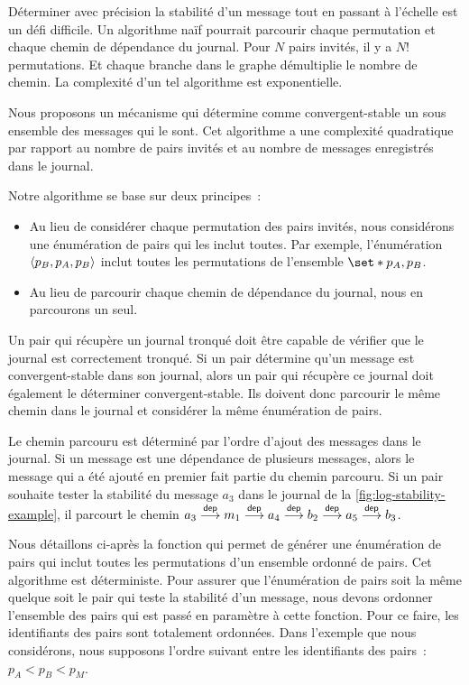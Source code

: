 Déterminer avec précision la stabilité d'un message tout en passant à l'échelle est un défi difficile.
Un algorithme naïf pourrait parcourir chaque permutation et chaque chemin de dépendance du journal.
Pour $N$ pairs invités, il y a $N!$ permutations.
Et chaque branche dans le graphe démultiplie le nombre de chemin.
La complexité d'un tel algorithme est exponentielle.

Nous proposons un mécanisme qui détermine comme convergent-stable un sous ensemble des messages qui le sont.
Cet algorithme a une complexité quadratique par rapport au nombre de pairs invités et au nombre de messages enregistrés dans le journal.

Notre algorithme se base sur deux principes~:
\begin{itemize}
    \item Au lieu de considérer chaque permutation des pairs invités, nous considérons une énumération de pairs qui les inclut toutes.
    Par exemple, l'énumération $\tuple*{p_B, p_A, p_B}$ inclut toutes les permutations de l'ensemble $\set*{p_A, p_B}$.
    \item Au lieu de parcourir chaque chemin de dépendance du journal, nous en parcourons un seul.
\end{itemize}

Un pair qui récupère un journal tronqué doit être capable de vérifier que le journal est correctement 
tronqué.
Si un pair détermine qu'un message est convergent-stable dans son journal, alors un pair qui récupère ce journal doit également le déterminer convergent-stable.
Ils doivent donc parcourir le même chemin dans le journal et considérer la même énumération de pairs.

Le chemin parcouru est déterminé par l'ordre d'ajout des messages dans le journal.
Si un message est une dépendance de plusieurs messages, alors le message qui a été ajouté en premier fait partie du chemin parcouru.
Si un pair souhaite tester la stabilité du message $a_3$ dans le journal de la \autoref{fig:log-stability-example}, il parcourt le chemin $a_3 \dep m_1 \dep a_4 \dep b_2 \dep a_5 \dep b_3$.

Nous détaillons ci-après la fonction qui permet de générer une énumération de pairs qui inclut toutes les permutations d'un ensemble ordonné de pairs.
Cet algorithme est déterministe.
Pour assurer que l'énumération de pairs soit la même quelque soit le pair qui teste la stabilité d'un message, nous devons ordonner l'ensemble des pairs qui est passé en paramètre à cette fonction.
Pour ce faire, les identifiants des pairs sont totalement ordonnées.
Dans l'exemple que nous considérons, nous supposons l'ordre suivant entre les identifiants des pairs~: $p_A < p_B < p_M$.

